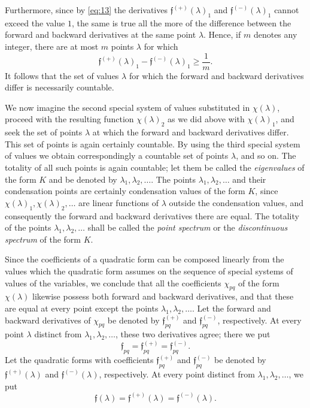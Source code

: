 \documentclass[b5paper,twoside]{article}
\newcommand{\originalpage}[1]{\phantomsection\label{origpage:#1}}
\begin{document}
Furthermore, since by \eqref{eq:13} the derivatives
$\mathfrak f^{(+)}(\lambda)_1$ and $\mathfrak f^{(-)}(\lambda)_1$ cannot
exceed the value $1$, the same is true all the more of the difference between
the forward and backward derivatives at the same point $\lambda$.  Hence, if
$m$ denotes any integer, there are at most $m$ points $\lambda$ for which
\[
  \mathfrak f^{(+)}(\lambda)_1-
  \mathfrak f^{(-)}(\lambda)_1\ge\frac1m.
\]
It follows that the set of values $\lambda$ for which the forward and
backward derivatives differ is necessarily countable.

We now imagine the second special system of values substituted in
$\chi(\lambda)$, proceed with the resulting function $\chi(\lambda)_2$ as we
did above with $\chi(\lambda)_1$, and seek the set of points $\lambda$ at
which the forward and backward derivatives differ.  This set of points is
again certainly countable.  By using the third special system of values we
obtain correspondingly a countable set of points $\lambda$, and so on.  The
totality of all such
\originalpage{169}points is again countable; let them be called the
\emph{eigenvalues} of the form $K$ and be denoted by
$\lambda_1,\lambda_2,\ldots$.  The points $\lambda_1,\lambda_2,\ldots$ and
their condensation points are certainly condensation values of the form
$K$, since $\chi(\lambda)_1,\chi(\lambda)_2,\ldots$ are linear functions of
$\lambda$ outside the condensation values, and consequently the forward and
backward derivatives there are equal.  The totality of the points
$\lambda_1,\lambda_2,\ldots$ shall be called the \emph{point spectrum} or the
\emph{discontinuous spectrum} of the form $K$.

Since the coefficients of a quadratic form can be composed linearly from the
values which the quadratic form assumes on the sequence of special systems of
values of the variables, we conclude that all the coefficients
$\chi_{pq}$ of the form $\chi(\lambda)$ likewise possess both forward and
backward derivatives, and that these are equal at every point except the
points $\lambda_1,\lambda_2,\ldots$.  Let the forward and backward derivatives
of $\chi_{pq}$ be denoted by $\mathfrak f_{pq}^{(+)}$ and
$\mathfrak f_{pq}^{(-)}$, respectively.  At every point $\lambda$ distinct
from $\lambda_1,\lambda_2,\ldots$, these two derivatives agree; there we put
\[
  \mathfrak f_{pq}=\mathfrak f_{pq}^{(+)}=\mathfrak f_{pq}^{(-)}.
\]
Let the quadratic forms with coefficients $\mathfrak f_{pq}^{(+)}$ and
$\mathfrak f_{pq}^{(-)}$ be denoted by $\mathfrak f^{(+)}(\lambda)$ and
$\mathfrak f^{(-)}(\lambda)$, respectively.  At every point distinct from
$\lambda_1,\lambda_2,\ldots$, we put
\[
  \mathfrak f(\lambda)
  =\mathfrak f^{(+)}(\lambda)=\mathfrak f^{(-)}(\lambda).
\]
\end{document}
